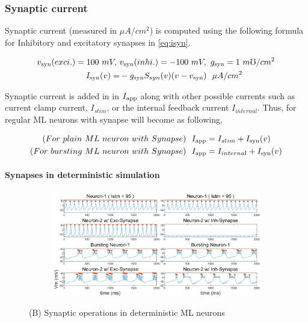 \documentclass[
]{article}
\begin{document}
\hypertarget{synaptic-current}{%
\subsubsection{Synaptic current}\label{synaptic-current}}

Synaptic current (measured in \(\mu A/cm^2\)) is computed using the following formula for Inhibitory and excitatory synapses in \eqref{eq:isyn}.

\begin{equation} \label{eq:isyn}
\begin{split}
v_{\rm syn}(exci.) = 100\ mV,\ &v_{\rm syn}(inhi.) = -100\ mV,\ g_{\rm syn} = 1\ m\mho/cm^2
\\ I_{\rm syn}(v) = &-g_{\rm syn}S_{syn}(v)(v-v_{\rm syn})\ \ \mu A/cm^2
\end{split}
\end{equation}

Synaptic current is added in in \(I_{\rm app}\) along with other possible currents such as current clamp current, \(I_{stim}\), or the internal feedback current \(I_{internal}\). Thus, for regular ML neurons with synapse will become as following,

\begin{equation} \label{eq:addsyn}
\begin{split}
(For\ plain\ ML\ neuron\ with\ Synapse)\ \ I_{\rm app} &= I_{stim} + I_{\rm syn}(v)
\\ (For\ bursting\ ML\ neuron\ with\ Synapse)\ \ I_{\rm app} &= I_{internal} + I_{\rm syn}(v)
\end{split}
\end{equation}

\hypertarget{synapses-in-deterministic-simulation}{%
\paragraph{Synapses in deterministic simulation}\label{synapses-in-deterministic-simulation}}

\begin{figure}  \ContinuedFloat
  \captionsetup[subfigure]{labelformat=empty} \centering
  \begin{subfigure}[b]{\textwidth}
      \caption{} \label{fig:fig2dt}
      \includegraphics[width=\textwidth]{figs/F2_B_ML_Synapse_Deter.png}
  \end{subfigure}
  \vspace{-0.5cm}
  \caption{(B) Synaptic operations in deterministic ML neurons}
\end{figure}
\end{document}
